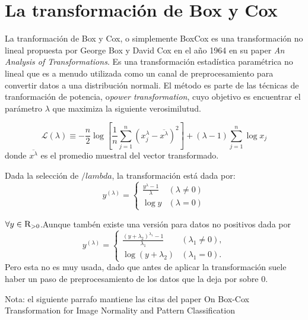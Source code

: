 \chapter{La transformaci\'on de Box y Cox}\label{chap4}
 

    La tranformaci\'on de Box y Cox, o simplemente BoxCox es una transformaci\'on no lineal propuesta por George Box y David Cox en el a\~no 1964 en su paper \textit{An Analysis of Transformations}. Es una transformaci\'on estad\'istica param\'etrica no lineal que es a menudo utilizada como un canal de preprocesamiento para convertir datos a una distribuci\'on normali. El método
    es parte de las t\'ecnicas de tranformaci\'on de potencia, o\textit{power transformation}, cuyo objetivo es
    encuentrar el par\'ametro $\lambda$ que maximiza la siguiente verosimilutud.

    \begin{equation}
        \mathcal{L}(\lambda) \equiv-\frac{n}{2} \log \left[\frac{1}{n} \sum_{j=1}^{n}\left(x_{j}^{\lambda}-\overline{x^{\lambda}}\right)^{2}\right] +(\lambda-1) \sum_{j=1}^{n} \log x_{j}
    \end{equation}
    donde $\overline{x^{\lambda}}$ es el promedio muestral del vector transformado.
    
    Dada la selecci\'on de $/lambda$, la transformaci\'on est\'a dada por:
    \begin{equation}\label{boxcox}
        y^{(\lambda)}= \begin{cases}\frac{y^{\lambda}-1}{\lambda} & (\lambda \neq 0) \\ \log y & (\lambda=0)\end{cases}
    \end{equation}

    $\forall y\in\textsc{R}_{>0}$.Aunque tamb\'en existe una versi\'on para datos no positivos dada por
    $$
    y^{(\lambda)}= \begin{cases}\frac{\left(y+\lambda_{2}\right)^{\lambda_{1}}-1}{\lambda_{1}} & \left(\lambda_{1} \neq 0\right), \\ \log \left(y+\lambda_{2}\right) & \left(\lambda_{1}=0\right) .\end{cases}
    $$
    Pero esta no es muy usada, dado que antes de aplicar la transformaci\'on suele haber un paso de preprocesamiento de los datos que la deja por sobre 0. 


    Nota: el siguiente parrafo mantiene las citas del paper On Box-Cox Transformation for Image Normality and Pattern Classification

